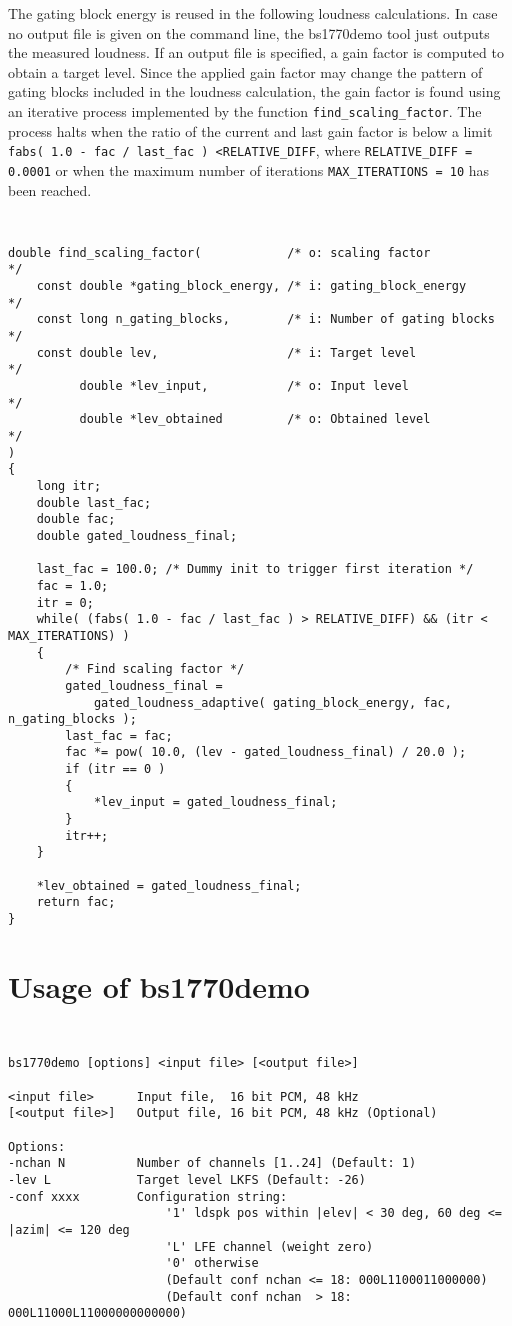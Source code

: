 The gating block energy is reused in the following loudness calculations. In case no output file is given on
the command line, the bs1770demo tool just outputs the measured loudness. If an output file is specified, a gain
factor is computed to obtain a target level. Since the applied gain factor may change the pattern of gating blocks
included in the loudness calculation, the gain factor is found using an iterative process implemented by the function
\texttt{find\_scaling\_factor}. The process halts when the ratio of the current and last gain factor is below a limit
\texttt{fabs( 1.0 - fac / last\_fac ) \textless RELATIVE\_DIFF}, where \texttt{RELATIVE\_DIFF = 0.0001} or when the maximum number of iterations \texttt{MAX\_ITERATIONS = 10}
has been reached.

{\tt\small
\begin{verbatim}
double find_scaling_factor(            /* o: scaling factor                 */
    const double *gating_block_energy, /* i: gating_block_energy            */
    const long n_gating_blocks,        /* i: Number of gating blocks        */
    const double lev,                  /* i: Target level                   */
          double *lev_input,           /* o: Input level                    */
          double *lev_obtained         /* o: Obtained level                 */
)
{
    long itr;
    double last_fac;
    double fac;
    double gated_loudness_final;

    last_fac = 100.0; /* Dummy init to trigger first iteration */
    fac = 1.0;
    itr = 0;
    while( (fabs( 1.0 - fac / last_fac ) > RELATIVE_DIFF) && (itr < MAX_ITERATIONS) )
    {
        /* Find scaling factor */
        gated_loudness_final = 
            gated_loudness_adaptive( gating_block_energy, fac, n_gating_blocks );
        last_fac = fac;
        fac *= pow( 10.0, (lev - gated_loudness_final) / 20.0 );
        if (itr == 0 )
        {
            *lev_input = gated_loudness_final;
        }
        itr++;
    }

    *lev_obtained = gated_loudness_final;
    return fac;
}
\end{verbatim}
}






\section{Usage of bs1770demo}

{\tt\small
\begin{verbatim}
bs1770demo [options] <input file> [<output file>]

<input file>      Input file,  16 bit PCM, 48 kHz
[<output file>]   Output file, 16 bit PCM, 48 kHz (Optional)

Options:
-nchan N          Number of channels [1..24] (Default: 1)
-lev L            Target level LKFS (Default: -26)
-conf xxxx        Configuration string:
                      '1' ldspk pos within |elev| < 30 deg, 60 deg <= |azim| <= 120 deg
                      'L' LFE channel (weight zero)
                      '0' otherwise
                      (Default conf nchan <= 18: 000L1100011000000)
                      (Default conf nchan  > 18: 000L11000L11000000000000)
\end{verbatim}
}
